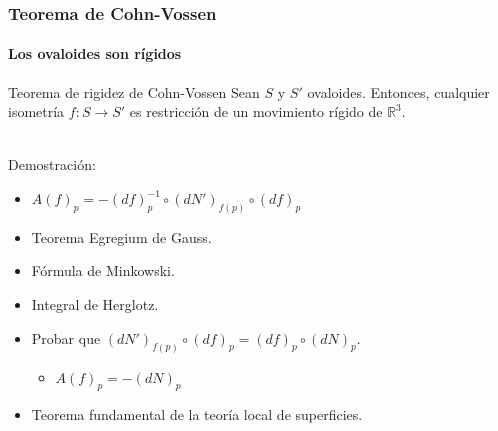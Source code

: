 \documentclass{beamer}
\begin{document}
	\begin{frame}
		\frametitle{Teorema de Cohn-Vossen}
		\framesubtitle{Los ovaloides son rígidos}
		\begin{block}{Teorema de rigidez de Cohn-Vossen}
			Sean $S$ y $S'$ ovaloides. Entonces, cualquier isometría $f : S \to S'$ es restricción de un movimiento rígido de $\mathbb{R}^3$.
		\end{block}
		${ }$\\
		Demostración:
		\begin{itemize}
			\item $A(f)_p = -(df)^{-1}_{p} \circ (dN')_{f(p)} \circ (df)_p$
			\item Teorema Egregium de Gauss.
			\item Fórmula de Minkowski.
			\item Integral de Herglotz.
			\item Probar que $(dN')_{f(p)} \circ (df)_p = (df)_p \circ (dN)_p$.
			\begin{itemize}
				\item $A(f)_p = -(dN)_p$
			\end{itemize}
			\item Teorema fundamental de la teoría local de superficies.
		\end{itemize}
	\end{frame}
	
\end{document}
